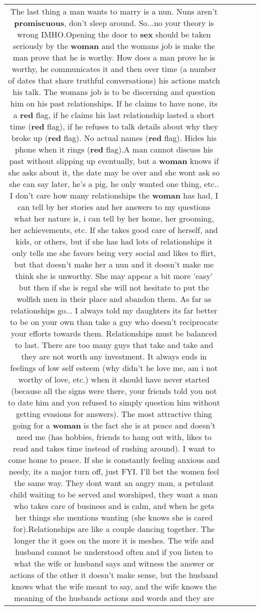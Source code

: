 \documentclass[11pt]{article}
\newlength\mylength
\begin{document}
\begin{center}
\begin{longtable}{|C{.65\mylength}|C{.30\mylength}|C{.12\mylength}|C{.12\mylength}|C{.12\mylength}|}
  \small The last thing a man wants to marry is a nun.  Nuns aren't \textbf{promiscuous}, don't sleep around.   So...no your theory is wrong IMHO.Opening the door to \textbf{sex} should be taken seriously by the \textbf{woman} and the womans job is make the man prove that he is worthy.   How does a man prove he is worthy, he communicates it and then over time (a number of dates that share truthful conversations) his actions match his talk.   The womans job is to be discerning and question him on his past relationships.  If he claims to have none, its a \textbf{r\textbf{ed}} flag, if he claims his last relationship lasted a short time (\textbf{r\textbf{ed}} flag), if he refuses to talk details about why they broke up (\textbf{r\textbf{ed}} flag).  No actual names (\textbf{r\textbf{ed}} flag).  Hides his phone when it rings (\textbf{r\textbf{ed}} flag).A man cannot discuss his past without slipping up eventually, but a \textbf{woman} knows if she asks about it, the date may be over and she wont ask so she can say later, he's a pig, he only wanted one thing,  etc..    I don't care how many relationships the \textbf{woman} has had, I can tell by her stories and her answers to my questions what her nature is, i can tell by her home, her grooming, her achievements, etc.  If she takes good care of herself, and kids, or others,  but if she has had lots of relationships it only tells me she favors being very social and likes to flirt, but that doesn't make her a nun and it doesn't make me think she is unworthy.   She may appear a bit more 'easy' but then if she is regal she will not hesitate to put the wolfish men in their place and abandon them.   As far as relationships go...  I always told my daughters its far better to be on your own than take a guy who doesn't reciprocate your efforts towards them.  Relationships must be balanced to last. There are too many guys that take and take and they are not worth any investment.   It always ends in feelings of low self esteem (why didn't he love me, am i not worthy of love, etc.) when it should have never started (because all the signs were there, your friends told you not to date him and you refused to simply question him without getting evasions for answers).  The most attractive thing going for a \textbf{woman} is the fact she is at peace and doesn't need me (has hobbies, friends to hang out with, likes to read and takes time instead of rushing around).  I want to come home to peace.  If she is constantly feeling anxious and needy, its a major turn off, just FYI. I'll bet the women feel the same way.  They dont want an angry man, a petulant child waiting to be served and worshiped, they want a man who takes care of business and is calm, and when he gets her things she mentions wanting (she knows she is cared for).Relationships are like a couple dancing together.  The longer the it goes on the more it is meshes.  The wife and husband cannot be understood often and if you listen to what the wife or husband says and witness the answer or actions of the other it doesn't make sense, but the husband knows what the wife meant to say, and the wife knows the meaning of the husbands actions and words and they are 
\end{longtable}
\end{center}
\end{document}
